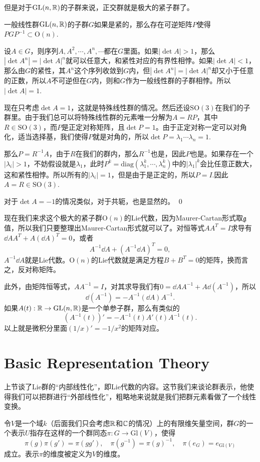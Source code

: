 但是对于$\mathrm{GL}(n,\mathbb{R})$的子群来说，正交群就是极大的紧子群了。

\pro 一般线性群$\mathrm{GL}(n,\mathbb{R})$的子群$G$如果是紧的，那么存在可逆矩阵$P$使得$PGP^{-1}\subset \mathrm{O}(n)$.

\proof 设$A\in G$，则序列$A,A^2,\cdots,A^n,\cdots$都在$G$里面。如果$|\det A|>1$，那么$|\det A^n|=|\det A|^n$就可以任意大，和紧性对应的有界性相悖。如果$|\det A|<1$，那么由$G$的紧性，其$A^n$这个序列收敛到$G$内，但$|\det A^n|=|\det A|^n$却又小于任意的正数，所以$A$不可逆但在$G$内，则和$G$作为一般线性群的子群相悖。所以$|\det A|=1$.

现在只考虑$\det A=1$，这就是特殊线性群的情况。然后还设$\mathrm{SO}(3)$在我们的子群里。由于我们总可以将特殊线性群的元素唯一分解为$A=RP$，其中$R\in \mathrm{SO}(3)$，而$P$是正定对称矩阵，且$\det P=1$。由于正定对称一定可以对角化，适当选择基，我们使得$P$就是对角的，所以$\det P=\lambda_1\cdots\lambda_n=1$.

那么$P=R^{-1}A$，由于$R$在我们的群内，那么$R^{-1}$也是，因此$P$也是。如果存在一个$|\lambda_i|>1$，不妨假设就是$\lambda_1$，此时$P^{k}=\mathrm{diag}(\lambda_1^k,\cdots,\lambda_n^k)$中的$|\lambda_1|^k$会比任意正数大，这和紧性相悖。所以所有的$|\lambda_i|=1$，但是由于是正定的，所以$P=I$.因此$A=R\in\mathrm{SO}(3)$.

对于$\det A=-1$的情况类似，对于共轭，也是显然的。 \qed

现在我们来求这个极大的紧子群$\mathrm{O}(n)$的Lie代数，因为Maurer-Cartan形式取${\mathfrak{g}}$值，所以我们只要整理出Maurer-Cartan形式就可以了。对恒等式$AA^T=I$求导有$\dd A A^T+A(\dd A)^T=0$，或者
\[
	A^{-1}\dd A+(A^{-1}\dd A)^T=0,
\]
$A^{-1}\dd A$就是Lie代数。$\mathrm{O}(n)$的Lie代数就是满足方程$B+B^T=0$的矩阵，换而言之，反对称矩阵。

此外，由矩阵恒等式，$AA^{-1}=I$，对其求导我们有$0=\dd A A^{-1}+A\dd(A^{-1})$，所以
\[
	\dd(A^{-1})=-A^{-1}(\dd A) A^{-1}.
\]
如果$A(t):\mathbb{R} \to \mathrm{GL}(n,\mathbb{R})$是一个单参子群，那么有类似的
\[
	(A^{-1}(t))'=-A^{-1}(t)A'(t) A^{-1}(t).
\]
以上就是微积分里面$(1/x)'=-1/x^2$的矩阵对应。

\section{Basic Representation Theory}

上节谈了Lie群的“内部线性化”，即Lie代数的内容。这节我们来谈论群表示，他使得我们可以把群进行“外部线性化”，粗略地来说就是我们把群元素看做了一个线性变换。

\para 令$V$是一个域$k$（后面我们只会考虑$\mathbb{R}$和$\mathbb{C}$的情况）上的有限维矢量空间，群$G$的一个表示$U$指存在这样的一个群同态$\pi:G\rightarrow \mathrm{Gl}(V)$，使得
\[
	\pi(g)\pi(g')=\pi(gg'),\quad \pi(g^{-1})=\pi(g)^{-1},\quad \pi(e_G)=e_{\mathrm{Gl}(V)}
\]
成立。表示$\pi$的维度被定义为$V$的维度。

